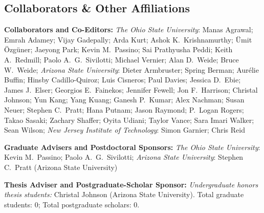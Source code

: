 \documentclass[svgnames,11pt]{article}
\begin{document}
\subsection{Collaborators \& Other Affiliations}

\begin{bibsection}

    \item \textbf{Collaborators and Co-Editors:}
        \emph{The Ohio State University}:
            Manas Agrawal;
            Emrah Adamey;
            Vijay Gadepally;
            Arda Kurt;
            Ashok K.~Krishnamurthy;
            \"{U}mit \"{O}zg\"{u}ner;
            Jaeyong Park;
            Kevin M.~Passino;
            Sai Prathyusha Peddi;
            Keith A.~Redmill;
            Paolo A.~G.~Sivilotti;
            Michael Vernier;
            Alan D.~Weide;
            Bruce W.~Weide;
        \emph{Arizona State University}:
            Dieter Armbruster;
            Spring Berman;
            Aur{\'{e}}lie Buffin;
            Hinsby Cadillo-Quiroz;
            Luis Cisneros;
            Paul Davies;
            Jessica D.~Ebie;
            James J.~Elser;
            Georgios E.~Fainekos;
            Jennifer Fewell;
            Jon F.~Harrison;
            Christal Johnson;
            Yun Kang;
            Yang Kuang;
            Ganesh P.~Kumar;
            Alex Nachman;
            Susan Neuer;
            Stephen C.~Pratt;
            Hana Putnam;
            Jason Raymond;
            P.~Logan Rogers;
            Takao Sasaki;
            Zachary Shaffer;
            Oyita Udiani;
            Taylor Vance;
            Sara Imari Walker;
            Sean Wilson;
        \emph{New Jersey Institute of Technology}:
            Simon Garnier;
            Chris Reid

    \item \textbf{Graduate Advisers and Postdoctoral Sponsors:}
        \emph{The Ohio State University}:
            Kevin M.~Passino;
            Paolo A.~G.~Sivilotti;
        \emph{Arizona State University}:
            Stephen C.~Pratt (Arizona State University)

    \item \textbf{Thesis Adviser and Postgraduate-Scholar Sponsor:}
        \emph{Undergraduate honors thesis students:}
            Christal Johnson (Arizona State University).
        Total graduate students: 0; Total postgraduate scholars: 0.


\end{bibsection}
\end{document}
